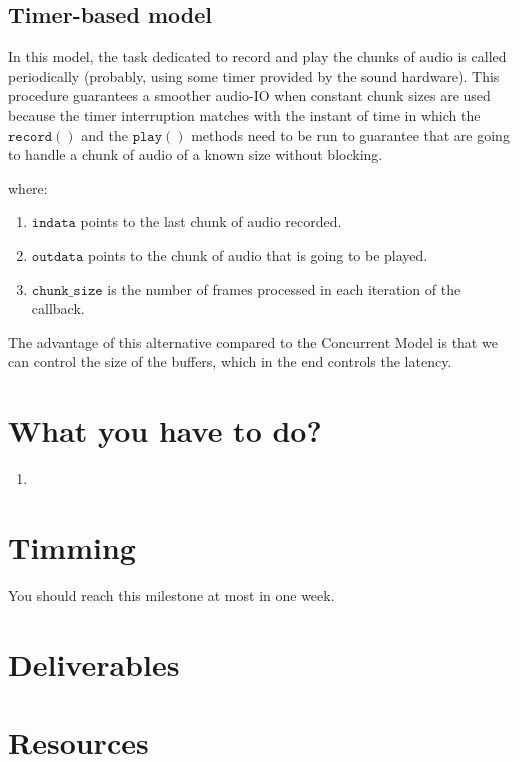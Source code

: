 \subsection{Timer-based model}

In this model, the task dedicated to record and play the chunks of
audio is called periodically (probably, using some timer provided by
the sound hardware). This procedure guarantees a smoother audio-IO
when constant chunk sizes are used because the timer interruption
matches with the instant of time in which the $\mathtt{record()}$ and
the $\mathtt{play()}$ methods need to be run to guarantee that are
going to handle a chunk of audio of a known size without blocking.


\begin{pseudocode}{Timer-based\_InterCom}{~}
  \BEGIN
     \GETS {}\\
    \\
    \mathtt{
    \mathtt{send(outgoing\_packet)}\\
    \mathtt{play}(\mathtt{chunk\_to\_play})\\
  \END
  \ENDPROCEDURE
\end{pseudocode}

where:
\begin{enumerate}
\item $\mathtt{indata}$ points to the last chunk of audio recorded.
\item $\mathtt{outdata}$ points to the chunk of audio that is going to be played.
\item $\mathtt{chunk\_size}$ is the number of frames processed in each iteration of the callback.
\end{enumerate}

The advantage of this alternative compared to the Concurrent Model is
that we can control the size of the buffers, which in the end controls the latency.

\section{What you have to do?}

\begin{enumerate}

\item
  
\end{enumerate}

\section{Timming}

You should reach this milestone at most in one week.

\section{Deliverables}

\section{Resources}


